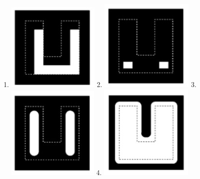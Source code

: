 \documentclass[11pt]{article}
\makeatletter
\def\maxwidth{\ifdim\Gin@nat@width>\linewidth\linewidth
    \else\Gin@nat@width\fi}
\let\Oldincludegraphics\includegraphics
\renewcommand{\includegraphics}[1]{\Oldincludegraphics[width=.8\maxwidth]{#1}}
\providecommand{\tightlist}{%
      \setlength{\itemsep}{0pt}\setlength{\parskip}{0pt}}
\makeatother
\begin{document}
\begin{enumerate}
\def\labelenumi{\arabic{enumi}.}
\tightlist
\item
  \includegraphics{wiki/1_2.jpg} 2. \includegraphics{wiki/1_3.jpg} 3.
  \includegraphics{wiki/1_4.jpg} 4. \includegraphics{wiki/1_5.jpg}
\end{enumerate}
\end{document}
